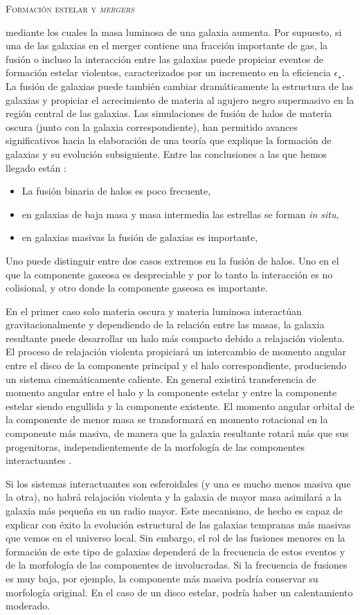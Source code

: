 \documentclass[xcolor=dvipsnames,4pt,hyperref={colorlinks,citecolor=black,linkcolor=black,urlcolor=black}]{beamer}
\begin{document}
\begin{frame}[allowframebreaks]{\textsc{Formación estelar y \emph{mergers}}}
\begin{description}
mediante los cuales la masa luminosa de una galaxia aumenta. Por supuesto, si una de las galaxias en
el merger contiene una fracción importante de gas, la fusión o incluso la interacción entre las
galaxias puede propiciar eventos de formación estelar violentos, caracterizados por un incremento en
la eficiencia $\epsilon_\star$. La fusión de galaxias puede también cambiar dramáticamente la
estructura de las galaxias y propiciar el acrecimiento de materia al agujero negro supermasivo en la
región central de las galaxias. Las simulaciones de fusión de halos de materia oscura (junto con la
galaxia correspondiente), han permitido avances significativos hacia la elaboración de una teoría
que explique la formación de galaxias y su evolución subsiguiente. Entre las conclusiones a las que
hemos llegado están \citep{Naab2016}:
%
\begin{itemize}
\item La fusión binaria de halos es poco frecuente,
\item en galaxias de baja masa y masa intermedia las estrellas se forman \emph{in situ},
\item en galaxias masivas la fusión de galaxias es importante,
\end{itemize}
%
Uno puede distinguir entre dos casos extremos en la fusión de halos. Uno en el que la componente
gaseosa es despreciable y por lo tanto la interacción es no colisional, y otro donde la componente
gaseosa es importante.

En el primer caso solo materia oscura y materia luminosa interactúan gravitacionalmente y
dependiendo de la relación entre las masas, la galaxia resultante puede desarrollar un halo más
compacto debido a relajación violenta. El proceso de relajación violenta propiciará un intercambio
de momento angular entre el disco de la componente principal y el halo correspondiente, produciendo
un sistema cinemáticamente caliente. En general existirá transferencia de momento angular entre el
halo y la componente estelar y entre la componente estelar siendo engullida y la componente
existente. El momento angular orbital de la componente de menor masa se transformará en momento
rotacional en la componente más masiva, de manera que la galaxia resultante rotará más que sus
progenitoras, independientemente de la morfología de las componentes interactuantes \citep{Qu2017}.

Si los sistemas interactuantes son esferoidales (y una es mucho menos masiva que la otra), no habrá
relajación violenta y la galaxia de mayor masa asimilará a la galaxia más pequeña en un radio mayor.
Este mecanismo, de hecho es capaz de explicar con éxito la evolución estructural de las galaxias
tempranas más masivas que vemos en el universo local. Sin embargo, el rol de las fusiones menores en
la formación de este tipo de galaxias dependerá de la frecuencia de estos eventos y de la morfología
de las componentes de involucradas. Si la frecuencia de fusiones es muy baja, por ejemplo, la
componente más masiva podría conservar su morfología original. En el caso de un disco estelar,
podría haber un calentamiento moderado.


\end{description}
\end{frame}
\end{document}
